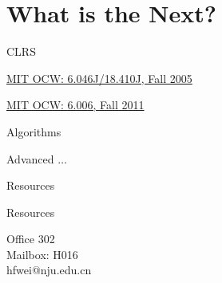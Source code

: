 \section{What is the Next?}

\begin{frame}{CLRS}

  \centerline{\href{https://ocw.mit.edu/courses/electrical-engineering-and-computer-science/6-046j-introduction-to-algorithms-sma-5503-fall-2005/video-lectures/}{MIT OCW: 6.046J/18.410J, Fall 2005}}
  \vspace{0.30cm}
  \centerline{\href{https://ocw.mit.edu/courses/electrical-engineering-and-computer-science/6-006-introduction-to-algorithms-fall-2011/}{MIT OCW: 6.006, Fall 2011}}
\end{frame}
\begin{frame}{Algorithms}
\end{frame}
\begin{frame}{Advanced $\dots$}


\end{frame}
\begin{frame}{Resources}
\end{frame}
\begin{frame}{Resources}
\end{frame}
\begin{frame}[noframenumbering]

  \begin{center}
	{\large
	  Office 302 \\[5pt]
	  Mailbox: H016 \\[5pt]
	  hfwei@nju.edu.cn }
  \end{center}
\end{frame}
